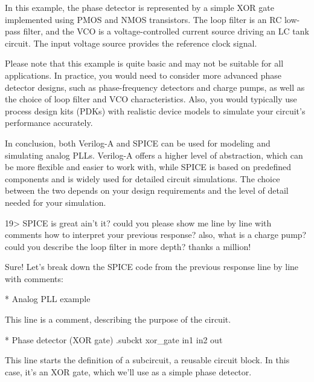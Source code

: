 \documentclass[
]{article}
\newenvironment{Shaded}{}{}
\newcommand{\NormalTok}[1]{#1}
\begin{document}
In this example, the phase detector is represented by a simple XOR gate
implemented using PMOS and NMOS transistors. The loop filter is an RC
low-pass filter, and the VCO is a voltage-controlled current source
driving an LC tank circuit. The input voltage source provides the
reference clock signal.

Please note that this example is quite basic and may not be suitable for
all applications. In practice, you would need to consider more advanced
phase detector designs, such as phase-frequency detectors and charge
pumps, as well as the choice of loop filter and VCO characteristics.
Also, you would typically use process design kits (PDKs) with realistic
device models to simulate your circuit's performance accurately.

In conclusion, both Verilog-A and SPICE can be used for modeling and
simulating analog PLLs. Verilog-A offers a higher level of abstraction,
which can be more flexible and easier to work with, while SPICE is based
on predefined components and is widely used for detailed circuit
simulations. The choice between the two depends on your design
requirements and the level of detail needed for your simulation.

19\textgreater{} SPICE is great ain't it? could you please show me line
by line with comments how to interpret your previous response? also,
what is a charge pump? could you describe the loop filter in more depth?
thanks a million!

Sure! Let's break down the SPICE code from the previous response line by
line with comments:

\begin{Shaded}
\begin{Highlighting}[]
\NormalTok{* Analog PLL example}
\end{Highlighting}
\end{Shaded}

This line is a comment, describing the purpose of the circuit.

\begin{Shaded}
\begin{Highlighting}[]
\NormalTok{* Phase detector (XOR gate)}
\NormalTok{.subckt xor\_gate in1 in2 out}
\end{Highlighting}
\end{Shaded}

This line starts the definition of a subcircuit, a reusable circuit
block. In this case, it's an XOR gate, which we'll use as a simple phase
detector.
\end{document}
